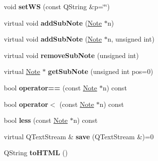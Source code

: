 \begin{DoxyCompactItemize}
\item 
\hypertarget{classNote_a1307f7d1b6bfbfc6d21dca0de8cc9d2e}{void {\bfseries set\-W\-S} (const \-Q\-String \&p=\char`\"{}\char`\"{})}\label{classNote_a1307f7d1b6bfbfc6d21dca0de8cc9d2e}

\item 
\hypertarget{classNote_aba4239202c30b1bf7780168e5785669d}{virtual void {\bfseries add\-Sub\-Note} (\hyperlink{classNote}{\-Note} $\ast$n)}\label{classNote_aba4239202c30b1bf7780168e5785669d}

\item 
\hypertarget{classNote_a8215d0746043be730aa9a38d7d3285f9}{virtual void {\bfseries add\-Sub\-Note} (\hyperlink{classNote}{\-Note} $\ast$n, unsigned int)}\label{classNote_a8215d0746043be730aa9a38d7d3285f9}

\item 
\hypertarget{classNote_a3d294d3e99587a0ad11a3e7c34b5ce5a}{virtual void {\bfseries remove\-Sub\-Note} (unsigned int)}\label{classNote_a3d294d3e99587a0ad11a3e7c34b5ce5a}

\item 
\hypertarget{classNote_ab5e66e683b06741279d1d985415d7aa6}{virtual \hyperlink{classNote}{\-Note} $\ast$ {\bfseries get\-Sub\-Note} (unsigned int pos=0)}\label{classNote_ab5e66e683b06741279d1d985415d7aa6}

\item 
\hypertarget{classNote_a9ac7c1fdeff4f4c5abc16a00d3363e7c}{bool {\bfseries operator==} (const \hyperlink{classNote}{\-Note} $\ast$n) const }\label{classNote_a9ac7c1fdeff4f4c5abc16a00d3363e7c}

\item 
\hypertarget{classNote_ae461ebd3ed6cefc5120467ce9e8a0c54}{bool {\bfseries operator$<$} (const \hyperlink{classNote}{\-Note} $\ast$n) const }\label{classNote_ae461ebd3ed6cefc5120467ce9e8a0c54}

\item 
\hypertarget{classNote_a445fbd0c16993baf1c13c0afed75edb2}{bool {\bfseries less} (const \hyperlink{classNote}{\-Note} $\ast$n) const }\label{classNote_a445fbd0c16993baf1c13c0afed75edb2}

\item 
\hypertarget{classNote_a61c1426d4ebaa250b0f5824686ab0418}{virtual \-Q\-Text\-Stream \& {\bfseries save} (\-Q\-Text\-Stream \&)=0}\label{classNote_a61c1426d4ebaa250b0f5824686ab0418}

\item 
\hypertarget{classNote_a7085a1f824cf244f0ce8b83294bbffc6}{\-Q\-String {\bfseries to\-H\-T\-M\-L} ()}\label{classNote_a7085a1f824cf244f0ce8b83294bbffc6}


\end{DoxyCompactItemize}
